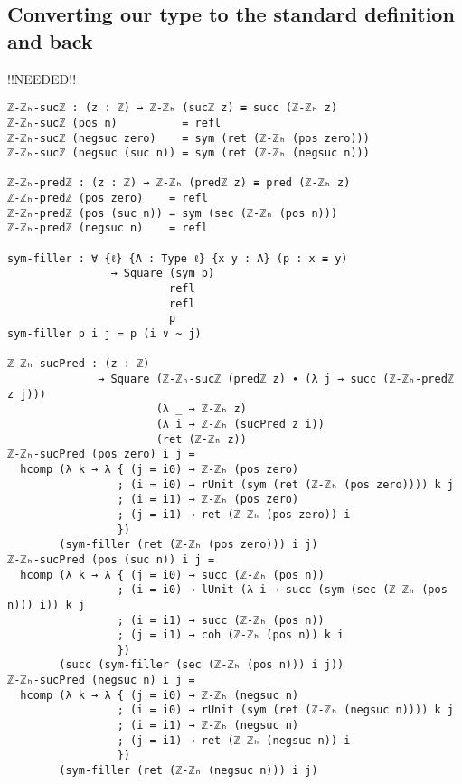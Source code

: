 \subsection{Converting our type to the standard definition and back}
!!NEEDED!!
\begin{verbatim}
ℤ-ℤₕ-sucℤ : (z : ℤ) → ℤ-ℤₕ (sucℤ z) ≡ succ (ℤ-ℤₕ z)
ℤ-ℤₕ-sucℤ (pos n)          = refl
ℤ-ℤₕ-sucℤ (negsuc zero)    = sym (ret (ℤ-ℤₕ (pos zero)))
ℤ-ℤₕ-sucℤ (negsuc (suc n)) = sym (ret (ℤ-ℤₕ (negsuc n)))

ℤ-ℤₕ-predℤ : (z : ℤ) → ℤ-ℤₕ (predℤ z) ≡ pred (ℤ-ℤₕ z)
ℤ-ℤₕ-predℤ (pos zero)    = refl
ℤ-ℤₕ-predℤ (pos (suc n)) = sym (sec (ℤ-ℤₕ (pos n)))
ℤ-ℤₕ-predℤ (negsuc n)    = refl

sym-filler : ∀ {ℓ} {A : Type ℓ} {x y : A} (p : x ≡ y)
                → Square (sym p)
                         refl
                         refl
                         p
sym-filler p i j = p (i ∨ ~ j)

ℤ-ℤₕ-sucPred : (z : ℤ)
              → Square (ℤ-ℤₕ-sucℤ (predℤ z) ∙ (λ j → succ (ℤ-ℤₕ-predℤ z j)))
                       (λ _ → ℤ-ℤₕ z)
                       (λ i → ℤ-ℤₕ (sucPred z i))
                       (ret (ℤ-ℤₕ z))
ℤ-ℤₕ-sucPred (pos zero) i j =
  hcomp (λ k → λ { (j = i0) → ℤ-ℤₕ (pos zero)
                 ; (i = i0) → rUnit (sym (ret (ℤ-ℤₕ (pos zero)))) k j
                 ; (i = i1) → ℤ-ℤₕ (pos zero)
                 ; (j = i1) → ret (ℤ-ℤₕ (pos zero)) i
                 })
        (sym-filler (ret (ℤ-ℤₕ (pos zero))) i j)
ℤ-ℤₕ-sucPred (pos (suc n)) i j =
  hcomp (λ k → λ { (j = i0) → succ (ℤ-ℤₕ (pos n))
                 ; (i = i0) → lUnit (λ i → succ (sym (sec (ℤ-ℤₕ (pos n))) i)) k j
                 ; (i = i1) → succ (ℤ-ℤₕ (pos n))
                 ; (j = i1) → coh (ℤ-ℤₕ (pos n)) k i
                 })
        (succ (sym-filler (sec (ℤ-ℤₕ (pos n))) i j))
ℤ-ℤₕ-sucPred (negsuc n) i j =
  hcomp (λ k → λ { (j = i0) → ℤ-ℤₕ (negsuc n)
                 ; (i = i0) → rUnit (sym (ret (ℤ-ℤₕ (negsuc n)))) k j
                 ; (i = i1) → ℤ-ℤₕ (negsuc n)
                 ; (j = i1) → ret (ℤ-ℤₕ (negsuc n)) i
                 })
        (sym-filler (ret (ℤ-ℤₕ (negsuc n))) i j)


\end{verbatim}
